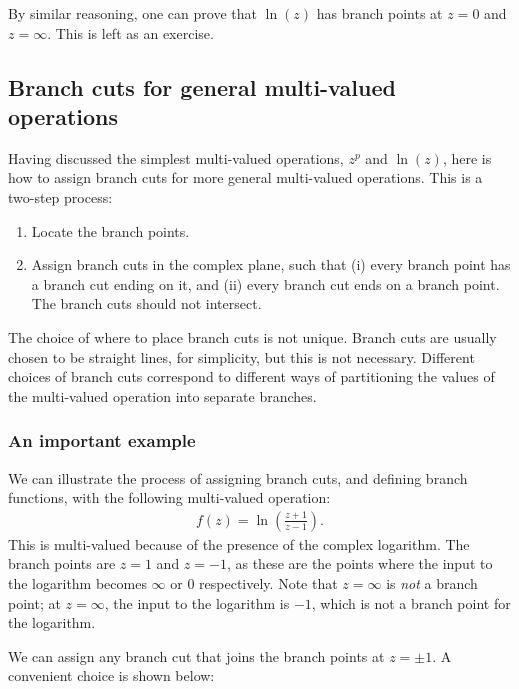 \documentclass[10pt,a4paper]{article}
\begin{document}
By similar reasoning, one can prove that $\ln(z)$ has branch points at
$z = 0$ and $z = \infty$.  This is left as an exercise.

\subsection{Branch cuts for general multi-valued operations}
\label{branch-cuts-for-general-multi-valued-operations}

Having discussed the simplest multi-valued operations, $z^p$ and
$\ln(z)$, here is how to assign branch cuts for more general
multi-valued operations. This is a two-step process:

\begin{enumerate}
\item Locate the branch points.

\item Assign branch cuts in the complex plane, such that (i) every
  branch point has a branch cut ending on it, and (ii) every branch
  cut ends on a branch point. The branch cuts should not intersect.
\end{enumerate}

\noindent
The choice of where to place branch cuts is not unique.  Branch cuts
are usually chosen to be straight lines, for simplicity, but this is
not necessary. Different choices of branch cuts correspond to
different ways of partitioning the values of the multi-valued
operation into separate branches.

\subsubsection{An important example}
\label{an-important-example}

We can illustrate the process of assigning branch cuts, and defining
branch functions, with the following multi-valued operation:
\begin{align}
  f(z) = \ln\left(\frac{z+1}{z-1}\right).
\end{align}
This is multi-valued because of the presence of the complex
logarithm. The branch points are $z = 1$ and $z = -1$, as these are
the points where the input to the logarithm becomes $\infty$ or $0$
respectively. Note that $z = \infty$ is \textit{not} a branch point;
at $z = \infty$, the input to the logarithm is $-1$, which is not a
branch point for the logarithm.

We can assign any branch cut that joins the branch points at $z = \pm
1$.  A convenient choice is shown below:
\end{document}
